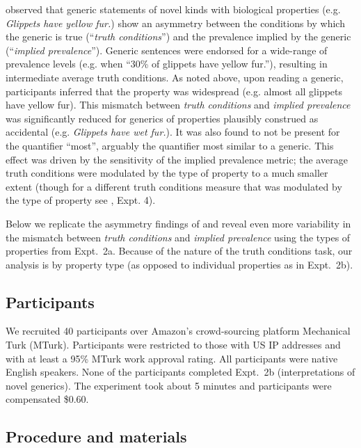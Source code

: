 \documentclass[10pt,letterpaper]{article}
\begin{document}
 observed that generic statements of novel kinds with biological properties (e.g. \emph{Glippets have yellow fur.}) show an asymmetry between the conditions by which the generic is true (``\emph{truth conditions}'') and the prevalence implied by the generic (``\emph{implied prevalence}''). 
Generic sentences were endorsed for a wide-range of prevalence levels (e.g. when ``30\% of glippets have yellow fur.''), resulting in intermediate average truth conditions. 
As noted above, upon reading a generic, participants inferred that the property was widespread (e.g. almost all glippets have yellow fur).
This mismatch between \emph{truth conditions} and \emph{implied prevalence} was significantly reduced for generics of properties plausibly construed as accidental (e.g. \emph{Glippets have wet fur.}).
It was also found to not be present for the quantifier ``most'', arguably the quantifier most similar to a generic.
This effect was driven by the sensitivity of the implied prevalence metric; the average truth conditions were modulated by the type of property to a much smaller extent (though for a different truth conditions measure that was modulated by the type of property see , Expt. 4).

Below we replicate the asymmetry findings of  and reveal even more variability in the mismatch between \emph{truth conditions} and \emph{implied prevalence} using the types of properties from Expt.~2a.
Because of the nature of the truth conditions task, our analysis is by property type (as opposed to individual properties as in Expt.~2b).


\subsection{Participants}

We recruited 40 participants over Amazon's crowd-sourcing platform Mechanical Turk (MTurk).  
Participants were restricted to those with US IP addresses and with at least a 95\% MTurk work approval rating. 
All participants were native English speakers. 
None of the participants completed Expt.~2b (interpretations of novel generics).
The experiment took about 5 minutes and participants were compensated \$0.60.

\subsection{Procedure and materials}
\end{document}

